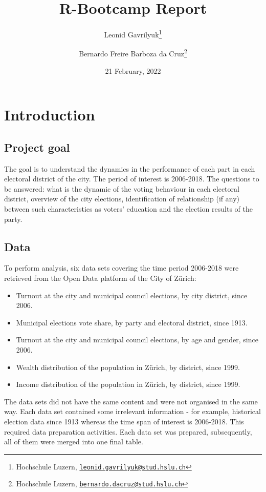 \documentclass[
]{article}
\title{R-Bootcamp Report}
\author{Leonid Gavrilyuk\footnote{Hochschule Luzern,
  \href{mailto:leonid.gavrilyuk@stud.hslu.ch}{\nolinkurl{leonid.gavrilyuk@stud.hslu.ch}}} \and Bernardo
Freire Barboza da Cruz\footnote{Hochschule Luzern,
  \href{mailto:bernardo.dacruz@stud.hslu.ch}{\nolinkurl{bernardo.dacruz@stud.hslu.ch}}}}
\date{21 February, 2022}
\providecommand{\tightlist}{%
  \setlength{\itemsep}{0pt}\setlength{\parskip}{0pt}}
\begin{document}
\maketitle

\centering
\raggedright
\newpage
\tableofcontents
\pagebreak

\hypertarget{introduction}{%
\section{Introduction}\label{introduction}}

\hypertarget{project-goal}{%
\subsection{Project goal}\label{project-goal}}

The goal is to understand the dynamics in the performance of each part
in each electoral district of the city. The period of interest is
2006-2018. The questions to be answered: what is the dynamic of the
voting behaviour in each electoral district, overview of the city
elections, identification of relationship (if any) between such
characteristics as voters' education and the election results of the
party.

\hypertarget{data}{%
\subsection{Data}\label{data}}

To perform analysis, six data sets covering the time period 2006-2018
were retrieved from the Open Data platform of the City of Zürich:

\begin{itemize}
\tightlist
\item
  Turnout at the city and municipal council elections, by city district,
  since 2006.
\item
  Municipal elections vote share, by party and electoral district, since
  1913.
\item
  Turnout at the city and municipal council elections, by age and
  gender, since 2006.
\item
  Wealth distribution of the population in Zürich, by district, since
  1999.
\item
  Income distribution of the population in Zürich, by district, since
  1999.
\end{itemize}

The data sets did not have the same content and were not organised in
the same way. Each data set contained some irrelevant information - for
example, historical election data since 1913 whereas the time span of
interest is 2006-2018. This required data preparation activities. Each
data set was prepared, subsequently, all of them were merged into one
final table.
\end{document}
